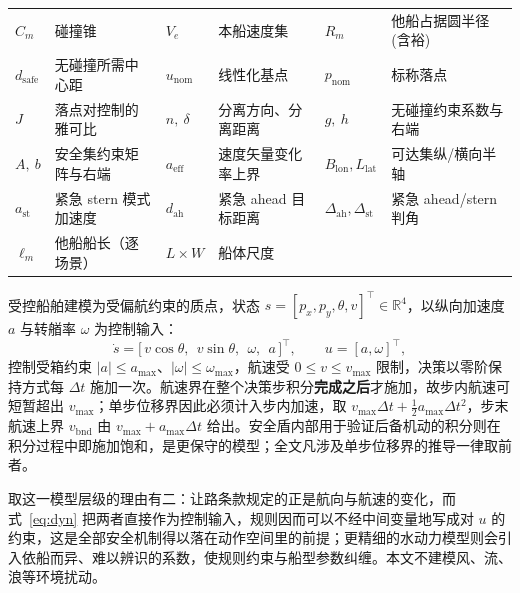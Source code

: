 \documentclass[12pt,letterpaper]{article}
\begin{document}
\begin{table}[htbp]
\begin{tabular*}{\linewidth}{@{\extracolsep{\fill}}llllll@{}}
  $C_m$ & 碰撞锥 & $V_e$ & 本船速度集 & $R_m$ & 他船占据圆半径(含裕) \\
  $d_{\mathrm{safe}}$ & 无碰撞所需中心距 & $u_{\mathrm{nom}}$ & 线性化基点 & $p_{\mathrm{nom}}$ & 标称落点 \\
  $J$ & 落点对控制的雅可比 & $n,\ \delta$ & 分离方向、分离距离 & $g,\ h$ & 无碰撞约束系数与右端 \\
  $A,\ b$ & 安全集约束矩阵与右端 & $a_{\mathrm{eff}}$ & 速度矢量变化率上界 & $B_{\mathrm{lon}},L_{\mathrm{lat}}$ & 可达集纵/横向半轴 \\
  $a_{\mathrm{st}}$ & 紧急 stern 模式加速度 & $d_{\mathrm{ah}}$ & 紧急 ahead 目标距离 & $\Delta_{\mathrm{ah}},\Delta_{\mathrm{st}}$ & 紧急 ahead/stern 判角 \\
  $\ell_m$ & 他船船长（逐场景） & $L\times W$ & 船体尺度 &  &  \\
  \bottomrule
 \end{tabular*}
\end{table}

受控船舶建模为受偏航约束的质点，状态 $s=[p_x,p_y,\theta,v]^{\!\top}\in\mathbb{R}^4$，以纵向加速度 $a$ 与转艏率 $\omega$ 为控制输入：
\begin{equation}
 \dot s=\bigl[\,v\cos\theta,\ \ v\sin\theta,\ \ \omega,\ \ a\,\bigr]^{\!\top},
 \qquad u=[a,\omega]^{\!\top},
 \label{eq:dyn}
\end{equation}
控制受箱约束 $|a|\le a_{\max}$、$|\omega|\le\omega_{\max}$，航速受 $0\le v\le v_{\max}$ 限制，决策以零阶保持方式每 $\Delta t$ 施加一次。航速界在整个决策步积分\textbf{完成之后}才施加，故步内航速可短暂超出 $v_{\max}$；单步位移界因此必须计入步内加速，取 $v_{\max}\Delta t+\tfrac12 a_{\max}\Delta t^2$，步末航速上界 $v_{\mathrm{bnd}}$ 由 $v_{\max}+a_{\max}\Delta t$ 给出。安全盾内部用于验证后备机动的积分则在积分过程中即施加饱和，是更保守的模型；全文凡涉及单步位移界的推导一律取前者。

取这一模型层级的理由有二：让路条款规定的正是航向与航速的变化，而式~\eqref{eq:dyn} 把两者直接作为控制输入，规则因而可以不经中间变量地写成对 $u$ 的约束，这是全部安全机制得以落在动作空间里的前提；更精细的水动力模型则会引入依船而异、难以辨识的系数，使规则约束与船型参数纠缠。本文不建模风、流、浪等环境扰动。
\end{document}
